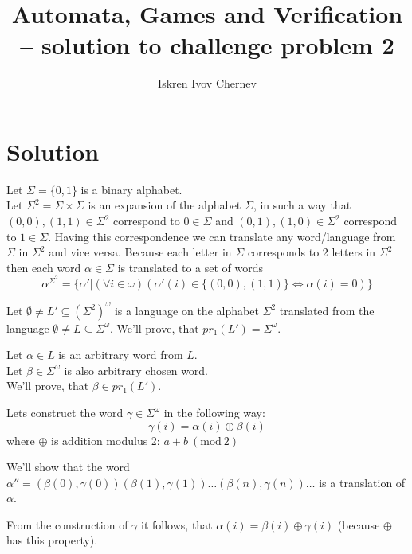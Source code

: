 \documentclass[a4paper]{article}
\begin{document}
\title{Automata, Games and Verification -- solution to challenge problem 2}
\author{Iskren Ivov Chernev}
\maketitle

\section*{Solution}

Let $ \Sigma = \{ 0, 1 \} $ is a binary alphabet. \\
Let $ \Sigma^2 = \Sigma \times \Sigma $ is an expansion of the alphabet
$ \Sigma $, in such a way that $ (0, 0), (1, 1) \in \Sigma^2 $ correspond to
$ 0 \in \Sigma $ and $ (0, 1), (1, 0) \in \Sigma^2 $ correspond to $ 1 \in
\Sigma $.  Having this correspondence we can translate any word/language from
$ \Sigma $ in $ \Sigma^2 $ and vice versa. Because each letter in $ \Sigma $ corresponds to
2 letters in $ \Sigma^2 $ then each word $ \alpha \in \Sigma $ is translated to
a set of words $$ \alpha^{\Sigma^2} = \{ \alpha' | (\forall i \in
\omega)(\alpha'(i) \in \{ (0, 0), (1, 1) \} \iff \alpha(i) = 0) \} $$

Let $ \emptyset \ne L'  \subseteq  (\Sigma^2)^\omega $ is a language on the
alphabet $ \Sigma^2 $ translated from the language $ \emptyset \ne L \subseteq
\Sigma^\omega $. We'll prove, that $ pr_1(L') = \Sigma^\omega $.

Let $ \alpha \in L $ is an arbitrary word from $ L $. \\ Let $ \beta \in
\Sigma^\omega $ is also arbitrary chosen word. \\ We'll prove, that $ \beta \in
pr_1(L') $.

Lets construct the word $ \gamma \in \Sigma^\omega $ in the following way:
$$
  \gamma(i) = \alpha(i) \oplus \beta(i)
$$
where $ \oplus $ is addition modulus 2: $ a + b\ (\mathrm{mod}\ 2) $

We'll show that the word $ \alpha'' = (\beta(0), \gamma(0))(\beta(1),
\gamma(1))\dots(\beta(n), \gamma(n))\dots $ is a translation of $ \alpha $.

From the construction of $ \gamma $ it follows, that $ \alpha(i) = \beta(i) \oplus \gamma(i) $ (because $ \oplus $ has this property).
\end{document}
